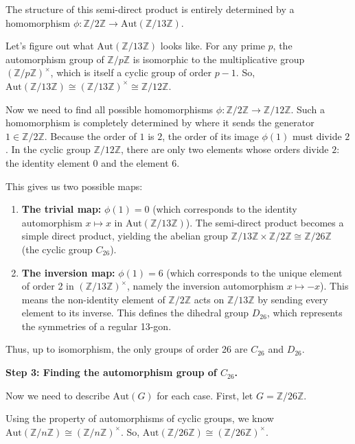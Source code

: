 \begin{solution}
The structure of this semi-direct product is entirely determined by a homomorphism $\phi: \mathbb{Z}/2\mathbb{Z} \to \text{Aut}(\mathbb{Z}/13\mathbb{Z})$.

Let's figure out what $\text{Aut}(\mathbb{Z}/13\mathbb{Z})$ looks like. For any prime $p$, the automorphism group of $\mathbb{Z}/p\mathbb{Z}$ is isomorphic to the multiplicative group $(\mathbb{Z}/p\mathbb{Z})^\times$, which is itself a cyclic group of order $p-1$. So, $\text{Aut}(\mathbb{Z}/13\mathbb{Z}) \cong (\mathbb{Z}/13\mathbb{Z})^\times \cong \mathbb{Z}/12\mathbb{Z}$.

Now we need to find all possible homomorphisms $\phi: \mathbb{Z}/2\mathbb{Z} \to \mathbb{Z}/12\mathbb{Z}$. Such a homomorphism is completely determined by where it sends the generator $1 \in \mathbb{Z}/2\mathbb{Z}$. Because the order of $1$ is $2$, the order of its image $\phi(1)$ must divide $2$. In the cyclic group $\mathbb{Z}/12\mathbb{Z}$, there are only two elements whose orders divide $2$: the identity element $0$ and the element $6$.

This gives us two possible maps:
\begin{enumerate}
    \item \textbf{The trivial map:} $\phi(1) = 0$ (which corresponds to the identity automorphism $x \mapsto x$ in $\text{Aut}(\mathbb{Z}/13\mathbb{Z})$). The semi-direct product becomes a simple direct product, yielding the abelian group $\mathbb{Z}/13\mathbb{Z} \times \mathbb{Z}/2\mathbb{Z} \cong \mathbb{Z}/26\mathbb{Z}$ (the cyclic group $C_{26}$).
    \item \textbf{The inversion map:} $\phi(1) = 6$ (which corresponds to the unique element of order 2 in $(\mathbb{Z}/13\mathbb{Z})^\times$, namely the inversion automorphism $x \mapsto -x$). This means the non-identity element of $\mathbb{Z}/2\mathbb{Z}$ acts on $\mathbb{Z}/13\mathbb{Z}$ by sending every element to its inverse. This defines the dihedral group $D_{26}$, which represents the symmetries of a regular 13-gon.
\end{enumerate}

Thus, up to isomorphism, the only groups of order 26 are $C_{26}$ and $D_{26}$.

\textbf{Step 3: Finding the automorphism group of $C_{26}$.}

Now we need to describe $\text{Aut}(G)$ for each case. First, let $G = \mathbb{Z}/26\mathbb{Z}$.

Using the property of automorphisms of cyclic groups, we know $\text{Aut}(\mathbb{Z}/n\mathbb{Z}) \cong (\mathbb{Z}/n\mathbb{Z})^\times$.
So, $\text{Aut}(\mathbb{Z}/26\mathbb{Z}) \cong (\mathbb{Z}/26\mathbb{Z})^\times$.


\end{solution}
